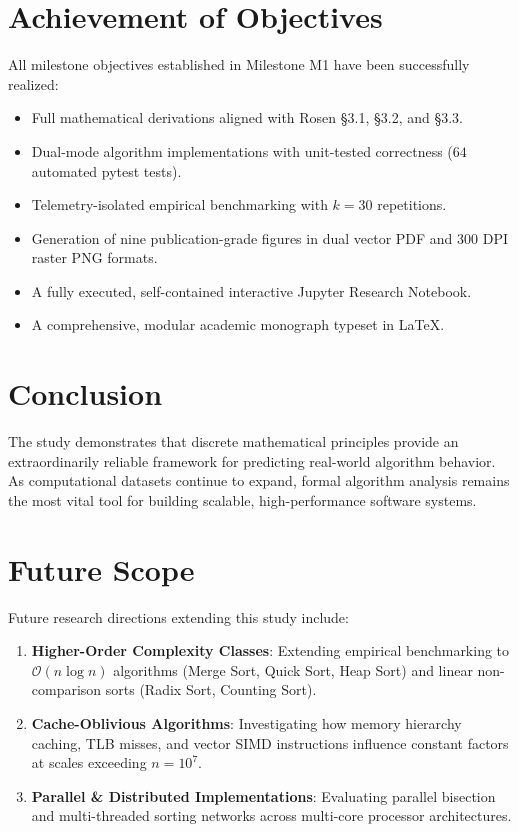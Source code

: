 \section{Achievement of Objectives}
All milestone objectives established in Milestone M1 have been successfully realized:
\begin{itemize}
    \item Full mathematical derivations aligned with Rosen §3.1, §3.2, and §3.3.
    \item Dual-mode algorithm implementations with unit-tested correctness ($64$ automated pytest tests).
    \item Telemetry-isolated empirical benchmarking with $k = 30$ repetitions.
    \item Generation of nine publication-grade figures in dual vector PDF and 300 DPI raster PNG formats.
    \item A fully executed, self-contained interactive Jupyter Research Notebook.
    \item A comprehensive, modular academic monograph typeset in LaTeX.
\end{itemize}

\section{Conclusion}
The study demonstrates that discrete mathematical principles provide an extraordinarily reliable framework for predicting real-world algorithm behavior. As computational datasets continue to expand, formal algorithm analysis remains the most vital tool for building scalable, high-performance software systems.

\section{Future Scope}
Future research directions extending this study include:
\begin{enumerate}
    \item \textbf{Higher-Order Complexity Classes}: Extending empirical benchmarking to $\mathcal{O}(n \log n)$ algorithms (Merge Sort, Quick Sort, Heap Sort) and linear non-comparison sorts (Radix Sort, Counting Sort).
    \item \textbf{Cache-Oblivious Algorithms}: Investigating how memory hierarchy caching, TLB misses, and vector SIMD instructions influence constant factors at scales exceeding $n = 10^7$.
    \item \textbf{Parallel & Distributed Implementations}: Evaluating parallel bisection and multi-threaded sorting networks across multi-core processor architectures.
\end{enumerate}
